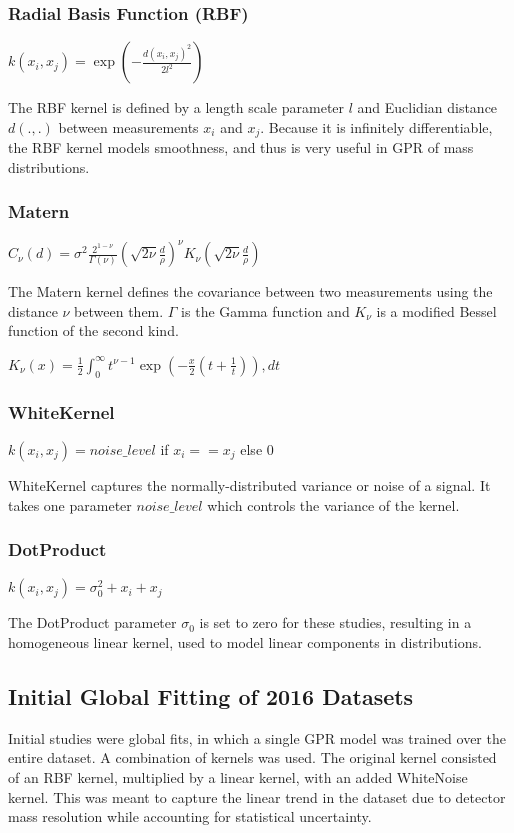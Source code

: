 \subsubsection{Radial Basis Function (RBF)}
$k(x_i, x_j) = \exp\left(-\frac{d(x_i, x_j)^2}{2l^2}\right)$


The RBF kernel is defined by a length scale parameter $l$ and Euclidian distance $d(.,.)$ between measurements $x_i$ and $x_j$. Because it is infinitely differentiable, the RBF kernel models smoothness, and thus is very useful in GPR of mass distributions.
\subsubsection{Matern}
$C_{\nu}(d) = \sigma^2 \frac{2^{1-\nu}}{\Gamma(\nu)} \left( \sqrt{2\nu} \frac{d}{\rho} \right)^{\nu} K_{\nu}\left( \sqrt{2\nu} \frac{d}{\rho} \right)$


The Matern kernel defines the covariance between two measurements using the distance $\nu$ between them. $\Gamma$ is the Gamma function and $K_\nu$ is a modified Bessel function of the second kind.

$K_{\nu}(x) = \frac{1}{2} \int_{0}^{\infty} t^{\nu - 1} \exp\left(-\frac{x}{2}\left(t + \frac{1}{t}\right)\right) , dt$

\subsubsection{WhiteKernel}
$k(x_i, x_j) = noise\_level$ if $x_i == x_j$ else 0

WhiteKernel captures the normally-distributed variance or noise of a signal. It takes one parameter $noise\_level$ which controls the variance of the kernel. 

\subsubsection{DotProduct}
$k(x_i, x_j) = \sigma_0^2 + x_i + x_j$

The DotProduct parameter $\sigma_0$ is set to zero for these studies, resulting in a homogeneous linear kernel, used to model linear components in distributions.

\subsection{Initial Global Fitting of 2016 Datasets}

Initial studies were global fits, in which a single GPR model was trained over the entire dataset. A combination of kernels was used. The original kernel consisted of an RBF kernel, multiplied by a linear kernel, with an added WhiteNoise kernel. This was meant to capture the linear trend in the dataset due to detector mass resolution while accounting for statistical uncertainty.

